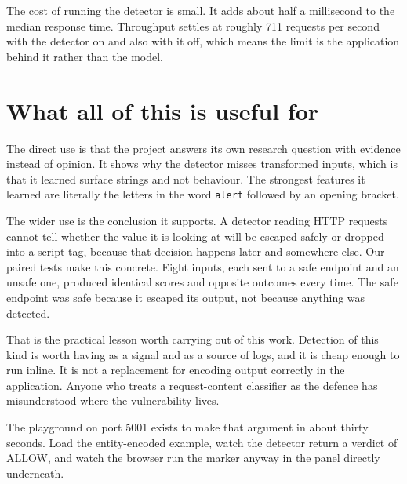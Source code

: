 \documentclass[11pt,a4paper]{article}
\newcommand{\tc}[1]{\texttt{\small #1}}
\begin{document}
The cost of running the detector is small. It adds about half a millisecond to the median
response time. Throughput settles at roughly 711 requests per second with the detector on
and also with it off, which means the limit is the application behind it rather than the
model.

\section{What all of this is useful for}

The direct use is that the project answers its own research question with evidence instead
of opinion. It shows why the detector misses transformed inputs, which is that it learned
surface strings and not behaviour. The strongest features it learned are literally the
letters in the word \tc{alert} followed by an opening bracket.

The wider use is the conclusion it supports. A detector reading HTTP requests cannot tell
whether the value it is looking at will be escaped safely or dropped into a script tag,
because that decision happens later and somewhere else. Our paired tests make this concrete.
Eight inputs, each sent to a safe endpoint and an unsafe one, produced identical scores and
opposite outcomes every time. The safe endpoint was safe because it escaped its output, not
because anything was detected.

That is the practical lesson worth carrying out of this work. Detection of this kind is
worth having as a signal and as a source of logs, and it is cheap enough to run inline. It
is not a replacement for encoding output correctly in the application. Anyone who treats a
request-content classifier as the defence has misunderstood where the vulnerability lives.

The playground on port 5001 exists to make that argument in about thirty seconds. Load the
entity-encoded example, watch the detector return a verdict of ALLOW, and watch the browser
run the marker anyway in the panel directly underneath.
\end{document}
